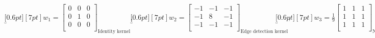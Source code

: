 \begin{footnotesize}\begin{align*}
  \underbracket[0.6pt][7pt]{
    w_1 =
    \begin{bmatrix}
      0 & 0 & 0 \\
      0 & 1 & 0 \\
      0 & 0 & 0 \\
    \end{bmatrix}
  }_{\text{Identity kernel}},
  &&
  \underbracket[0.6pt][7pt]{
    w_2 =
    \begin{bmatrix}
      -1 & -1 & -1 \\
      -1 & 8 & -1 \\
      -1 & -1 & -1 \\
    \end{bmatrix}
  }_{\text{Edge detection kernel}},
  &&
  \underbracket[0.6pt][7pt]{
    w_3 =
    \frac{1}{9}
    \begin{bmatrix}
      1 & 1 & 1 \\
      1 & 1 & 1 \\
      1 & 1 & 1 \\
    \end{bmatrix}
  }_{\text{Normalized box blur kernel}},
  &&
  \underbracket[0.6pt][7pt]{
    w_4 =
    \frac{1}{16}
    \begin{bmatrix}
      1 & 2 & 1 \\
      2 & 4 & 2 \\
      1 & 2 & 1 \\
    \end{bmatrix}
  }_{\text{Gaussian blur kernel}}.
\end{align*}\end{footnotesize}

